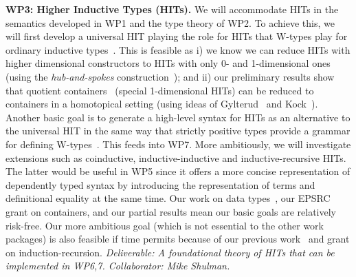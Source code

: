 \documentclass[a4paper,11pt]{article}
\begin{document}
{\bf WP3: Higher Inductive Types (HITs).}  We will accommodate HITs in
the semantics developed in WP1 and the type theory of WP2. To
achieve this, we will first develop a universal HIT playing the role
for HITs that W-types play for ordinary inductive
types~\cite{alti:cont-tcs}. This is feasible as i) we know we can
reduce HITs with higher dimensional constructors to HITs with only 0-
and 1-dimensional ones (using the \emph{hub-and-spokes}
construction~\cite{hott-book}); and ii) our preliminary results show
that quotient containers~\cite{alti:mpc04} (special 1-dimensional
HITs) can be reduced to containers in a homotopical setting (using
ideas of Gylterud~\cite{gylterud:thesis} and
Kock~\cite{kock:groupoids}).  Another basic goal is to generate a
high-level syntax for HITs as an alternative to the universal HIT in
the same way that strictly positive types provide a grammar for
defining W-types~\cite{alti:cont-tcs}.  This feeds into WP7.  More
ambitiously, we will investigate extensions such as coinductive,
inductive-inductive and inductive-recursive HITs. The latter would be
useful in WP5 since it offers a more concise representation of
dependently typed syntax by introducing the representation of terms
and definitional equality at the same time.  Our work on data
types~\cite{alti:cont-tcs, alti:mpc04,
  altenkirchGhaniHancockMcBrideMorris:indexedContainers,
  GambinoN:polfpm,awodeyGamSoja:indTypesInHTT},
our EPSRC grant on containers, and our partial results 
mean our basic goals are relatively risk-free.
Our more ambitious goal (which is not essential to the other work packages) is also feasible if time
permits because of our previous work~\cite{alti:catind2,ghani:fibredIR}
and grant on induction-recursion. {\em Deliverable: A foundational theory of HITs that 
  can be implemented in WP6,7.
  Collaborator: Mike Shulman.  }
\end{document}
